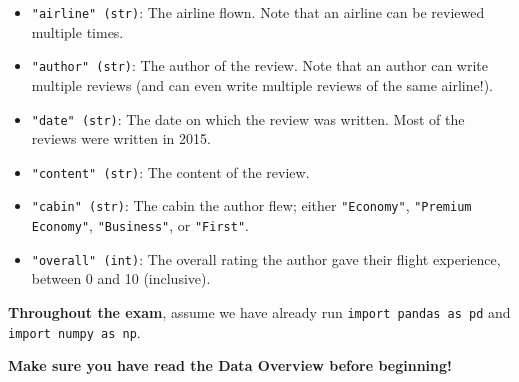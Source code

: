 \documentclass[twoside,12pt]{article}
\begin{document}
\begin{itemize}

\item{\texttt{"airline" (str)}: The airline flown. Note that an airline can be reviewed multiple times.}
\item \texttt{"author" (str)}: The author of the review. Note that an author can write multiple reviews (and can even write multiple reviews of the same airline!).
\item \texttt{"date" (str)}: The date on which the review was written. Most of the reviews were written in 2015.
\item \texttt{"content" (str)}: The content of the review.
\item \texttt{"cabin" (str)}: The cabin the author flew; either \texttt{"Economy"}, \texttt{"Premium Economy"}, \texttt{"Business"}, or \texttt{"First"}.
\item \texttt{"overall" (int)}: The overall rating the author gave their flight experience, between 0 and 10 (inclusive).

\end{itemize}


\noindent \textbf{Throughout the exam}, assume we have already run \texttt{import pandas as pd} and \texttt{import numpy as np}.

\newpage

\noindent \textbf{Make sure you have read the Data Overview before beginning!}
\end{document}
